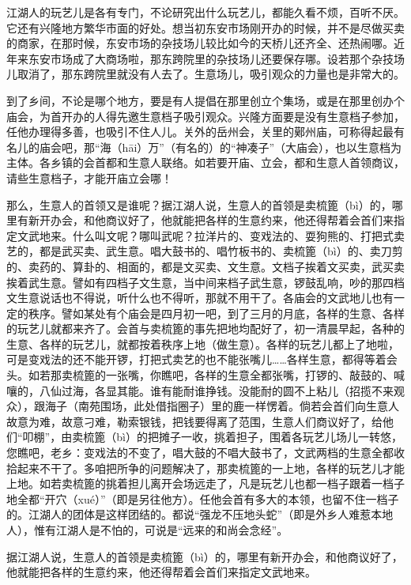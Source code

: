 \documentclass[12pt,UTF8]{ctexbook}
\begin{document}
江湖人的玩艺儿是各有专门，不论研究出什么玩艺儿，都能久看不烦，百听不厌。它还有兴隆地方繁华市面的好处。想当初东安市场刚开办的时候，并不是尽做买卖的商家，在那时候，东安市场的杂技场儿较比如今的天桥儿还齐全、还热闹哪。近年来东安市场成了大商场啦，那东跨院里的杂技场儿还要保存哪。设若那个杂技场儿取消了，那东跨院里就没有人去了。生意场儿，吸引观众的力量也是非常大的。

到了乡间，不论是哪个地方，要是有人提倡在那里创立个集场，或是在那里创办个庙会，为首开办的人得先邀生意档子吸引观众。兴隆方面要是没有生意档子参加，任他办理得多善，也吸引不住人儿。关外的岳州会，关里的鄚州庙，可称得起最有名儿的庙会吧，那“海（hāi）万”（有名的）的“神凑子”（大庙会），也以生意档为主体。各乡镇的会首都和生意人联络。如若要开庙、立会，都和生意人首领商议，请些生意档子，才能开庙立会哪！

那么，生意人的首领又是谁呢？据江湖人说，生意人的首领是卖梳篦（bì）的，哪里有新开办会，和他商议好了，他就能把各样的生意约来，他还得帮着会首们来指定文武地来。什么叫文呢？哪叫武呢？拉洋片的、变戏法的、耍狗熊的、打把式卖艺的，都是武买卖、武生意。唱大鼓书的、唱竹板书的、卖梳篦（bì）的、卖刀剪的、卖药的、算卦的、相面的，都是文买卖、文生意。文档子挨着文买卖，武买卖挨着武生意。譬如有四档子文生意，当中间来档子武生意，锣鼓乱响，吵的那四档文生意说话也不得说，听什么也不得听，那就不用干了。各庙会的文武地儿也有一定的秩序。譬如某处有个庙会是四月初一吧，到了三月的月底，各样的生意、各样的玩艺儿就都来齐了。会首与卖梳篦的事先把地均配好了，初一清晨早起，各种的生意、各样的玩艺儿，就都按着秩序上地（做生意）。各样的玩艺儿都上了地啦，可是变戏法的还不能开锣，打把式卖艺的也不能张嘴儿……各样生意，都得等着会头。如若那卖梳篦的一张嘴，你瞧吧，各样的生意全都张嘴，打锣的、敲鼓的、喊嚷的，八仙过海，各显其能。谁有能耐谁挣钱。没能耐的圆不上粘儿（招揽不来观众），跟海子（南苑围场，此处借指圈子）里的鹿一样愣着。倘若会首们向生意人故意为难，故意刁难，勒索银钱，把钱要得离了范围，生意人们商议好了，给他们“叩棚”，由卖梳篦（bì）的把摊子一收，挑着担子，围着各玩艺儿场儿一转悠，您瞧吧，老乡：变戏法的不变了，唱大鼓的不唱大鼓书了，文武两档的生意全都收拾起来不干了。多咱把所争的问题解决了，那卖梳篦的一上地，各样的玩艺儿才能上地。如若卖梳篦的挑着担儿离开会场远走了，凡是玩艺儿也都一档子跟着一档子地全都“开穴（xué）”（即是另往他方）。任他会首有多大的本领，也留不住一档子的。江湖人的团体是这样团结的。都说“强龙不压地头蛇”（即是外乡人难惹本地人），惟有江湖人是不怕的，可说是“远来的和尚会念经”。

据江湖人说，生意人的首领是卖梳篦（bì）的，哪里有新开办会，和他商议好了，他就能把各样的生意约来，他还得帮着会首们来指定文武地来。
\end{document}
